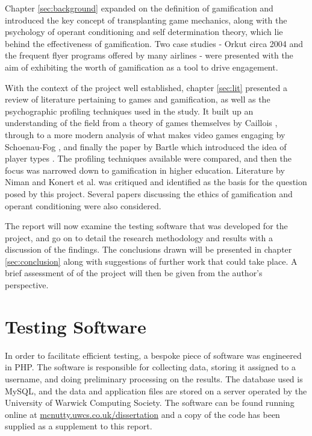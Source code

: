 \documentclass[12pt,a4paper,twoside]{report}
\begin{document}
Chapter \ref{sec:background} expanded on the definition of gamification and introduced the key concept of transplanting game mechanics, along with the psychology of operant conditioning and self determination theory, which lie behind the effectiveness of gamification. Two case studies - Orkut circa 2004 and the frequent flyer programs offered by many airlines - were presented with the aim of exhibiting the worth of gamification as a tool to drive engagement.

With the context of the project well established, chapter \ref{sec:lit} presented a review of literature pertaining to games and gamification, as well as the psychographic profiling techniques used in the study. It built up an understanding of the field from a theory of games themselves by Caillois \cite{caillois1961man}, through to a more modern analysis of what makes video games engaging by Schoenau-Fog \cite{schoenau2011player}, and finally the paper by Bartle which introduced the idea of player types \cite{bartle1996hearts}. The profiling techniques available were compared, and then the focus was narrowed down to gamification in higher education. Literature by Niman \cite{niman2014gamification} and Konert et al. \cite{konertmodeling} was critiqued and identified as the basis for the question posed by this project. Several papers discussing the ethics of gamification and operant conditioning were also considered.

The report will now examine the testing software that was developed for the project, and go on to detail the research methodology and results with a discussion of the findings. The conclusions drawn will be presented in chapter \ref{sec:conclusion} along with suggestions of further work that could take place. A brief assessment of of the project will then be given from the author's perspective.

\chapter{Testing Software}
\label{sec:software}
In order to facilitate efficient testing, a bespoke piece of software was engineered in PHP. The software is responsible for collecting data, storing it assigned to a username, and doing preliminary processing on the results. The database used is MySQL, and the data and application files are stored on a server operated by the University of Warwick Computing Society. The software can be found running online at \url{mcnutty.uwcs.co.uk/dissertation} and a copy of the code has been supplied as a supplement to this report.
\end{document}
